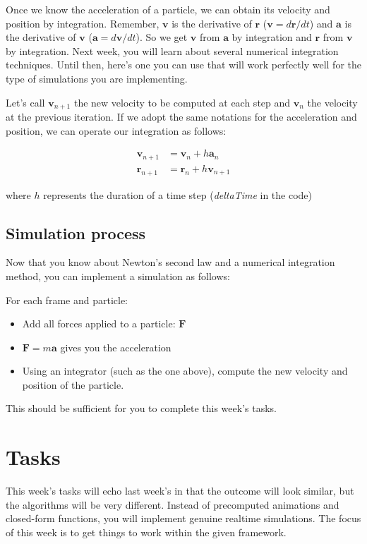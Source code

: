 \documentclass[12pt]{article}
\begin{document}
Once we know the acceleration of a particle, we can obtain its velocity and position by integration. Remember, $\bm{v}$ is the derivative of $\bm{r}$ ($\bm{v} = d\bm{r}/dt$) and $\bm{a}$ is the derivative of $\bm{v}$ ($\bm{a} = d\bm{v}/dt$). So we get $\bm{v}$ from $\bm{a}$ by integration and $\bm{r}$ from $\bm{v}$ by integration. Next week, you will learn about several numerical integration techniques. Until then, here's one you can use that will work perfectly well for the type of simulations you are implementing.

Let's call $\bm{v}_{n+1}$ the new velocity to be computed at each step and $\bm{v}_{n}$ the velocity at the previous iteration. If we adopt the same notations for the acceleration and position, we can
operate our integration as follows:

\begin{align}
\bm{v}_{n+1} &= \bm{v}_n + h\bm{a}_n \\
\bm{r}_{n+1} &= \bm{r}_n + h\bm{v}_{n+1}
\end{align}

where $h$ represents the duration of a time step (\emph{deltaTime} in the code)

\subsection*{Simulation process}

Now that you know about Newton's second law and a numerical integration method, you can implement a simulation as follows:

For each frame and particle:

\begin{itemize}
\item Add all forces applied to a particle: $\bm{F}$
\item $\bm{F} = m\bm{a}$ gives you the acceleration
\item Using an integrator (such as the one above), compute the new velocity and position of the particle.
\end{itemize}

This should be sufficient for you to complete this week's tasks.

\section*{Tasks}

This week's tasks will echo last week's in that the outcome will look similar, but the algorithms will be very different. Instead of precomputed animations and closed-form functions, you will implement genuine realtime simulations. The focus of this week is to get things to work within the given framework. 
\end{document}
